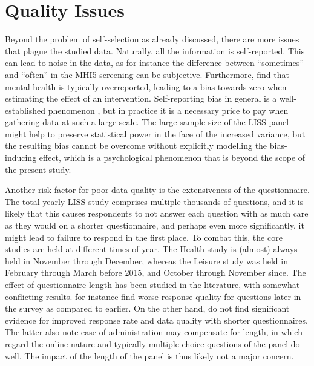 \section{Quality Issues}
\label{sec:data:quality}
Beyond the problem of self-selection as already discussed, there are more issues that plague the studied data.
Naturally, all the information is self-reported. This can lead to noise in the data, as for instance the difference
between ``sometimes'' and ``often'' in the MHI5 screening can be subjective. Furthermore,  find that
mental health is typically overreported, leading to a bias towards zero when estimating the effect of an intervention.
Self-reporting bias in general is a well-established phenomenon \cite{rosenman2011measuring}, but in practice it is a
necessary price to pay when gathering data at such a large scale. The large sample size of the LISS panel might
help to preserve statistical power in the face of the increased variance, but the resulting bias cannot be overcome
without explicitly modelling the bias-inducing effect, which is a psychological phenomenon that is beyond the scope of the
present study.

Another risk factor for poor data quality is the extensiveness of the questionnaire. The total yearly LISS study
comprises multiple thousands of questions, and it is likely that this causes respondents to not answer each question
with as much care as they would on a shorter questionnaire, and perhaps even more significantly, it might lead to
failure to respond in the first place.
To combat this, the core studies are held at different times of year. The Health study is (almost) always held in November
through December, whereas the Leisure study was held in February through March before 2015, and October through November since.
The effect of questionnaire length has been studied in the literature, with somewhat conflicting results.  for instance
find worse response quality for questions later in the survey as compared to earlier. On the other hand, 
do not find significant evidence for improved response rate and data quality with shorter questionnaires. The latter
also note ease of administration may compensate for length, in which regard the online nature and typically multiple-choice
questions of the panel do well. The impact of the length of the panel is thus likely not a major concern.

